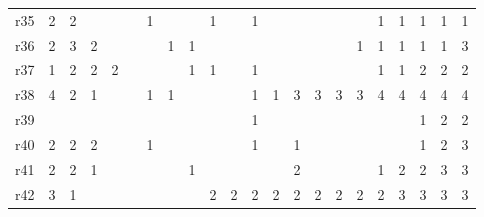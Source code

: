 {\begin{tabular}{l*{21}{r}}
r35& \cellcolor{white} 2& \cellcolor{white} 2& & & & \cellcolor{cyan!10} 1& & & \cellcolor{cyan!10} 1& & \cellcolor{cyan!10} 1& & & & & & \cellcolor{cyan!10} 1& \cellcolor{cyan!10} 1& \cellcolor{cyan!10} 1& \cellcolor{cyan!10} 1& \cellcolor{cyan!10} 1\\ 
r36& \cellcolor{magenta!10} 2& \cellcolor{white} 3& \cellcolor{magenta!10} 2& & & & \cellcolor{magenta!10} 1& \cellcolor{magenta!10} 1& & & & & & & & \cellcolor{magenta!10} 1& \cellcolor{magenta!10} 1& \cellcolor{magenta!10} 1& \cellcolor{magenta!10} 1& \cellcolor{magenta!10} 1& \cellcolor{white} 3\\ 
r37& \cellcolor{cyan!10} 1& \cellcolor{white} 2& \cellcolor{white} 2& \cellcolor{white} 2& & & & \cellcolor{cyan!10} 1& \cellcolor{cyan!10} 1& & \cellcolor{cyan!10} 1& & & & & & \cellcolor{cyan!10} 1& \cellcolor{cyan!10} 1& \cellcolor{white} 2& \cellcolor{white} 2& \cellcolor{white} 2\\ 
r38& \cellcolor{white} 4& \cellcolor{magenta!10} 2& \cellcolor{magenta!10} 1& & & \cellcolor{magenta!10} 1& \cellcolor{magenta!10} 1& & & & \cellcolor{magenta!10} 1& \cellcolor{magenta!10} 1& \cellcolor{magenta!10} 3& \cellcolor{magenta!10} 3& \cellcolor{magenta!10} 3& \cellcolor{magenta!10} 3& \cellcolor{white} 4& \cellcolor{white} 4& \cellcolor{white} 4& \cellcolor{white} 4& \cellcolor{white} 4\\ 
r39& & & & & & & & & & & \cellcolor{magenta!10} 1& & & & & & & & \cellcolor{magenta!10} 1& \cellcolor{magenta!10} 2& \cellcolor{magenta!10} 2\\ 
r40& \cellcolor{magenta!10} 2& \cellcolor{magenta!10} 2& \cellcolor{magenta!10} 2& & & \cellcolor{magenta!10} 1& & & & & \cellcolor{magenta!10} 1& & \cellcolor{magenta!10} 1& & & & & & \cellcolor{magenta!10} 1& \cellcolor{magenta!10} 2& \cellcolor{white} 3\\ 
r41& \cellcolor{magenta!10} 2& \cellcolor{magenta!10} 2& \cellcolor{magenta!10} 1& & & & & \cellcolor{magenta!10} 1& & & & & \cellcolor{magenta!10} 2& & & & \cellcolor{magenta!10} 1& \cellcolor{magenta!10} 2& \cellcolor{magenta!10} 2& \cellcolor{white} 3& \cellcolor{white} 3\\ 
r42& \cellcolor{white} 3& \cellcolor{magenta!10} 1& & & & & & & \cellcolor{magenta!10} 2& \cellcolor{magenta!10} 2& \cellcolor{magenta!10} 2& \cellcolor{magenta!10} 2& \cellcolor{magenta!10} 2& \cellcolor{magenta!10} 2& \cellcolor{magenta!10} 2& \cellcolor{magenta!10} 2& \cellcolor{magenta!10} 2& \cellcolor{white} 3& \cellcolor{white} 3& \cellcolor{white} 3& \cellcolor{white} 3\\ 

\end{tabular}}
